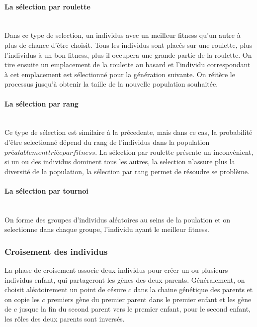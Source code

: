 \documentclass{article}
\begin{document}
        \paragraph{La sélection par roulette}\mbox{}\\
        Dans ce type de selection, un individus avec un meilleur fitness qu'un autre à plus de chance d'être choisit. Tous les individus sont placés sur une roulette, plus l'individus à un bon fitness, plus il occupera une grande partie de la roulette. On tire ensuite un emplacement de la roulette au hasard et l'individu correspondant à cet emplacement est sélectionné pour la génération suivante. On réitère le processus jusqu'à obtenir la taille de la nouvelle population souhaitée.

        \paragraph{La sélection par rang}\mbox{}\\
        Ce type de sélection est similaire à la précedente, mais dans ce cas, la probabilité d'être selectionné dépend du rang de l'individus dans la population \(préalablement triée par fitness\). La sélection par roulette présente un inconvénient, si un ou des individus dominent tous les autres, la selection n'assure plus la diversité de la population, la sélection par rang permet de résoudre se problème.

        \paragraph{La sélection par tournoi}\mbox{}\\
        On forme des groupes d'individus aléatoires au seins de la poulation et on selectionne dans chaque groupe, l'individu ayant le meilleur fitness.

        \subsubsection{Croisement des individus}
        La phase de croisement associe deux individus pour créer un ou plusieurs individus enfant, qui partageront les gènes des deux parents. Généralement, on choisit aléatoirement un point de césure $c$ dans la chaine génétique des parents et on copie les $c$ premiers gène du premier parent dans le premier enfant et les gène de $c$ jusque la fin du second parent vers le premier enfant, pour le second enfant, les rôles des deux parents sont inversés.
\end{document}
